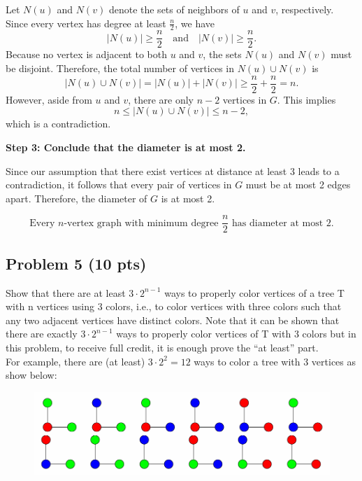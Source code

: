 \documentclass[12pt]{article}
\begin{document}
Let $N(u)$ and $N(v)$ denote the sets of neighbors of $u$ and $v$, respectively. Since every vertex has degree at least $\frac{n}{2}$, we have
\[
|N(u)| \ge \frac{n}{2} \quad \text{and} \quad |N(v)| \ge \frac{n}{2}.
\]
Because no vertex is adjacent to both $u$ and $v$, the sets $N(u)$ and $N(v)$ must be disjoint. Therefore, the total number of vertices in $N(u) \cup N(v)$ is
\[
|N(u) \cup N(v)| = |N(u)| + |N(v)| \ge \frac{n}{2} + \frac{n}{2} = n.
\]
However, aside from $u$ and $v$, there are only $n-2$ vertices in $G$. This implies
\[
n \le |N(u) \cup N(v)| \le n - 2,
\]
which is a contradiction.

\bigskip
\textbf{Step 3: Conclude that the diameter is at most 2.}

Since our assumption that there exist vertices at distance at least 3 leads to a contradiction, it follows that every pair of vertices in $G$ must be at most 2 edges apart. Therefore, the diameter of $G$ is at most 2.

\[
\boxed{\text{Every } n\text{-vertex graph with minimum degree } \frac{n}{2} \text{ has diameter at most } 2.}
\]

\subsection*{Problem 5 (10 pts)}
Show that there are at least $3\cdot2^{n-1}$ ways to properly color vertices of a tree T with n vertices using 3 colors, i.e., to color vertices with three colors such that any two adjacent vertices have  distinct colors. Note that it can be shown that there are exactly $3\cdot2^{n-1}$ ways to properly color vertices of T with 3 colors but in this problem, to receive full credit, it is enough prove the “at least” part.\\
For example, there are (at least) $3\cdot2^2 = 12$ ways to color a tree with 3 vertices as show below:

\begin{figure}[H]
    \centering
    \includegraphics[width=0.8\linewidth]{P5.png}
    \label{fig:3-color-graph}
\end{figure}
\end{document}
